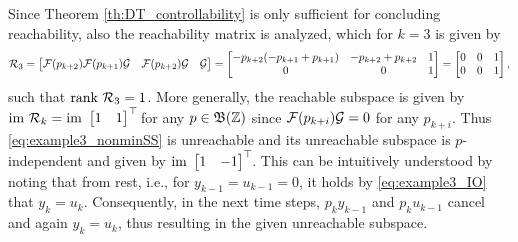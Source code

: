Since Theorem \ref{th:DT_controllability} is only sufficient for concluding reachability, also the  reachability matrix is analyzed, which for $k=3$ is given by
\begin{equation}
    \mathcal{R}_3 = \begin{bmatrix} \mathcal{F}(p_{k+2}) \mathcal{F}(p_{k+1}) \mathcal{G} & \mathcal{F}(p_{k+2}) \mathcal{G} & 
    \mathcal{G} \end{bmatrix} = \begin{bmatrix} -p_{k+2} (-p_{k+1} + p_{k+1}) & -p_{k+2} + p_{k+2} & 1 \\ 0 & 0 & 1 \end{bmatrix} = \begin{bmatrix} 0 & 0 & 1 \\ 0 & 0 & 1 \end{bmatrix},
\end{equation}
such that $\rank\ \Rcal_3 = 1$. More generally, the reachable subspace is given by $\textrm{im}\ \mathcal{R}_k = \textrm{im}\ \begin{bmatrix} 1 & 1\end{bmatrix}^\top\!$ for any $p\in\mathfrak{B}(\mathbb{Z})$ since $\mathcal{F}(p_{k+i}) \mathcal{G} = 0$ for any $p_{k+i}$. Thus \eqref{eq:example3_nonminSS} is unreachable and its unreachable subspace is $p$-independent and given by $\textrm{im}\ \begin{bmatrix} 1& -1\end{bmatrix}^\top\!$. This can be intuitively understood by noting that from rest, i.e., for $y_{k-1}=u_{k-1} =0$, it holds by \eqref{eq:example3_IO} that $y_k = u_k$. Consequently, in the next time steps, $p_k y_{k-1}$ and $p_k u_{k-1}$ cancel and again $y_k = u_k$, thus resulting in the given unreachable subspace. 

